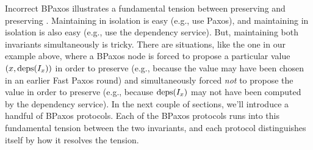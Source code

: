 Incorrect BPaxos illustrates a fundamental tension between preserving
 and preserving .
Maintaining  in isolation is easy (e.g., use Paxos),
and maintaining  in isolation is also easy (e.g., use
the dependency service). But, maintaining both invariants simultaneously is
tricky. There are situations, like the one in our example above, where a BPaxos
node is forced to propose a particular value $(x, \text{deps}(I_x))$ in order to
preserve  (e.g., because the value may have been
chosen in an earlier Fast Paxos round) and simultaneously forced \emph{not} to
propose the value in order to preserve  (e.g.,
because $\text{deps}(I_x)$ may not have been computed by the dependency service).
%
In the next couple of sections, we'll introduce a handful of BPaxos protocols.
Each of the BPaxos protocols runs into this fundamental tension between the two
invariants, and each protocol distinguishes itself by how it resolves the
tension.
